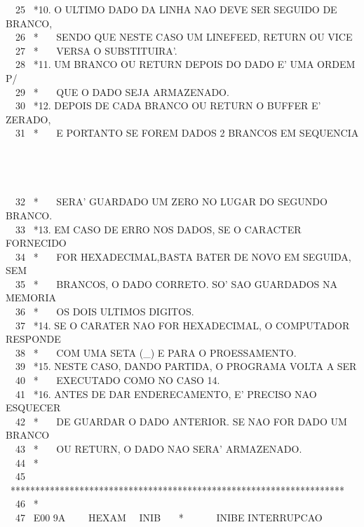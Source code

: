 \documentclass[a4paper,12pt]{article}
\begin{document}
\noindent \ \ 25 \ *10. O ULTIMO DADO DA LINHA NAO DEVE SER SEGUIDO DE BRANCO,\\
\phantom \ \ 26 \ * \ \ \ SENDO QUE NESTE CASO UM LINEFEED, RETURN OU VICE\\
\phantom \ \ 27 \ * \ \ \ VERSA O SUBSTITUIRA'.\\
\phantom \ \ 28 \ *11. UM BRANCO OU RETURN DEPOIS DO DADO E' UMA ORDEM P/\\
\phantom \ \ 29 \ * \ \ \ QUE O DADO SEJA ARMAZENADO.\\
\phantom \ \ 30 \ *12. DEPOIS DE CADA BRANCO OU RETURN O BUFFER E' ZERADO,\\
\phantom \ \ 31 \ * \ \ \ E PORTANTO SE FOREM DADOS 2 BRANCOS EM SEQUENCIA\\
\\
\\
\\
\\
\phantom \ \ 32 \ * \ \ \ SERA' GUARDADO UM ZERO NO LUGAR DO SEGUNDO BRANCO.\\
\phantom \ \ 33 \ *13. EM CASO DE ERRO NOS DADOS, SE O CARACTER FORNECIDO\\
\phantom \ \ 34 \ * \ \ \ FOR HEXADECIMAL,BASTA BATER DE NOVO EM SEGUIDA, SEM\\
\phantom \ \ 35 \ * \ \ \ BRANCOS, O DADO CORRETO. SO' SAO GUARDADOS NA MEMORIA\\
\phantom \ \ 36 \ * \ \ \ OS DOIS ULTIMOS DIGITOS.\\
\phantom \ \ 37 \ *14. SE O CARATER NAO FOR HEXADECIMAL, O COMPUTADOR RESPONDE\\
\phantom \ \ 38 \ * \ \ \ COM UMA SETA (\_) E PARA O PROESSAMENTO.\\
\phantom \ \ 39 \ *15. NESTE CASO, DANDO PARTIDA, O PROGRAMA VOLTA A SER\\
\phantom \ \ 40 \ * \ \ \ EXECUTADO COMO NO CASO 14.\\
\phantom \ \ 41 \ *16. ANTES DE DAR ENDERECAMENTO, E' PRECISO NAO ESQUECER\\
\phantom \ \ 42 \ * \ \ \ DE GUARDAR O DADO ANTERIOR. SE NAO FOR DADO UM BRANCO\\
\phantom \ \ 43 \ * \ \ \ OU RETURN, O DADO NAO SERA' ARMAZENADO.\\
\phantom \ \ 44 \ *\\
\phantom \ \ 45 \ ********************************************************************\\
\phantom \ \ 46 \ *\\
\phantom \ \ 47 \ E00 9A \ \ \ \ HEXAM \ \ INIB \ \ \ * \ \ \ \ \ \ INIBE INTERRUPCAO\\
\end{document}
